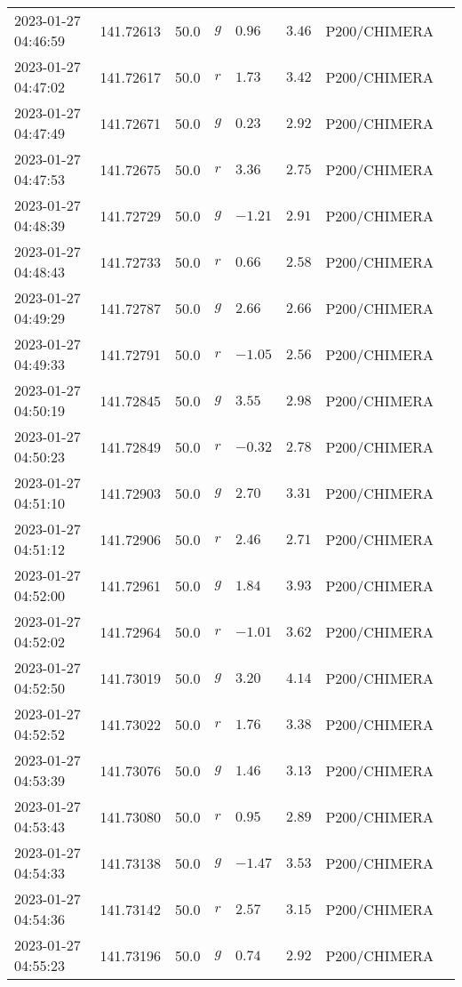 \documentclass{nature_plusfigure}
\begin{document}
\begin{supplement}
\begin{center}
\begin{longtable}{llllllll}
2023-01-27 04:46:59 & 141.72613 & 50.0 & $g$ & $0.96$ & $3.46$ & P200/CHIMERA &  \\ 
2023-01-27 04:47:02 & 141.72617 & 50.0 & $r$ & $1.73$ & $3.42$ & P200/CHIMERA &  \\ 
2023-01-27 04:47:49 & 141.72671 & 50.0 & $g$ & $0.23$ & $2.92$ & P200/CHIMERA &  \\ 
2023-01-27 04:47:53 & 141.72675 & 50.0 & $r$ & $3.36$ & $2.75$ & P200/CHIMERA &  \\ 
2023-01-27 04:48:39 & 141.72729 & 50.0 & $g$ & $-1.21$ & $2.91$ & P200/CHIMERA &  \\ 
2023-01-27 04:48:43 & 141.72733 & 50.0 & $r$ & $0.66$ & $2.58$ & P200/CHIMERA &  \\ 
2023-01-27 04:49:29 & 141.72787 & 50.0 & $g$ & $2.66$ & $2.66$ & P200/CHIMERA &  \\ 
2023-01-27 04:49:33 & 141.72791 & 50.0 & $r$ & $-1.05$ & $2.56$ & P200/CHIMERA &  \\ 
2023-01-27 04:50:19 & 141.72845 & 50.0 & $g$ & $3.55$ & $2.98$ & P200/CHIMERA &  \\ 
2023-01-27 04:50:23 & 141.72849 & 50.0 & $r$ & $-0.32$ & $2.78$ & P200/CHIMERA &  \\ 
2023-01-27 04:51:10 & 141.72903 & 50.0 & $g$ & $2.70$ & $3.31$ & P200/CHIMERA &  \\ 
2023-01-27 04:51:12 & 141.72906 & 50.0 & $r$ & $2.46$ & $2.71$ & P200/CHIMERA &  \\ 
2023-01-27 04:52:00 & 141.72961 & 50.0 & $g$ & $1.84$ & $3.93$ & P200/CHIMERA &  \\ 
2023-01-27 04:52:02 & 141.72964 & 50.0 & $r$ & $-1.01$ & $3.62$ & P200/CHIMERA &  \\ 
2023-01-27 04:52:50 & 141.73019 & 50.0 & $g$ & $3.20$ & $4.14$ & P200/CHIMERA &  \\ 
2023-01-27 04:52:52 & 141.73022 & 50.0 & $r$ & $1.76$ & $3.38$ & P200/CHIMERA &  \\ 
2023-01-27 04:53:39 & 141.73076 & 50.0 & $g$ & $1.46$ & $3.13$ & P200/CHIMERA &  \\ 
2023-01-27 04:53:43 & 141.73080 & 50.0 & $r$ & $0.95$ & $2.89$ & P200/CHIMERA &  \\ 
2023-01-27 04:54:33 & 141.73138 & 50.0 & $g$ & $-1.47$ & $3.53$ & P200/CHIMERA &  \\ 
2023-01-27 04:54:36 & 141.73142 & 50.0 & $r$ & $2.57$ & $3.15$ & P200/CHIMERA &  \\ 
2023-01-27 04:55:23 & 141.73196 & 50.0 & $g$ & $0.74$ & $2.92$ & P200/CHIMERA &  \\ 

\end{longtable}
\end{center}
\end{supplement}
\end{document}
